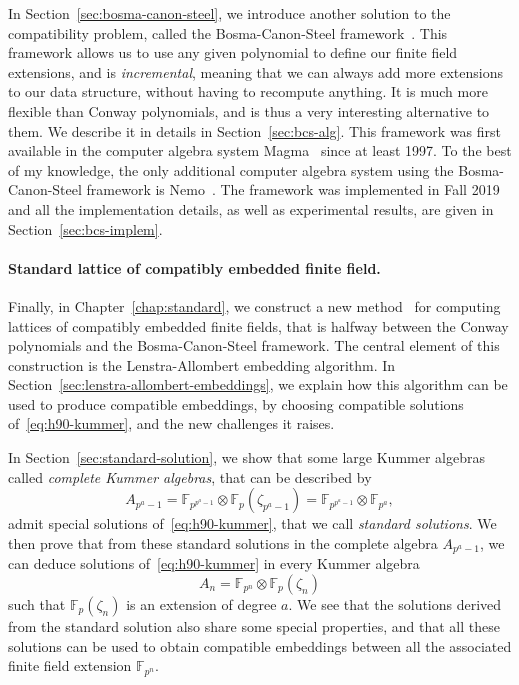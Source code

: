 In Section~\ref{sec:bosma-canon-steel}, we introduce another solution to the
compatibility problem, called the Bosma-Canon-Steel framework~\cite{BCS97}.
This framework allows us to use any given polynomial to define our finite field
extensions, and is \emph{incremental}, meaning that we can always add more
extensions to our data structure, without having to recompute anything. It is
much more flexible than Conway polynomials, and is thus a very interesting
alternative to them. We describe it in details in Section~\ref{sec:bcs-alg}.
This framework was first available in the computer algebra system
Magma~\cite{Magma} since at least 1997. To the best of my knowledge, the only
additional computer algebra system using the Bosma-Canon-Steel framework is
Nemo~\cite{Nemo}. The framework was implemented in Fall 2019 and all the
implementation details, as well as experimental results, are given in
Section~\ref{sec:bcs-implem}.

\paragraph{Standard lattice of compatibly embedded finite field.}
Finally, in Chapter~\ref{chap:standard}, we construct a new method~\cite{DRR19}
for computing lattices of compatibly embedded finite fields, that is halfway
between the Conway polynomials and the Bosma-Canon-Steel framework. The central
element of this construction is the Lenstra-Allombert embedding algorithm. In
Section~\ref{sec:lenstra-allombert-embeddings}, we explain how this algorithm
can be used to produce compatible embeddings, by choosing compatible solutions
of~\eqref{eq:h90-kummer}, and the new challenges it raises.

In Section~\ref{sec:standard-solution}, we show that some large Kummer algebras
called \emph{complete Kummer algebras}, that can be described by
\[
  A_{p^a-1} = \mathbb{F}_{p^{p^a-1}}\otimes\mathbb{F}_{p}(\zeta_{p^a-1})
  = \mathbb{F}_{p^{p^a-1}}\otimes \mathbb{F}_{p^a},
\]
admit special solutions of~\eqref{eq:h90-kummer}, that we call \emph{standard
solutions}. We then prove that from these standard solutions in the complete
algebra $A_{p^a-1}$, we can deduce solutions of~\eqref{eq:h90-kummer} in every
Kummer algebra
\[
  A_n = \mathbb{F}_{p^n}\otimes \mathbb{F}_{p}(\zeta_n)
\]
such that $\mathbb{F}_{p}(\zeta_n)$ is an extension of degree $a$. We see that
the solutions derived from the standard solution also share some special
properties, and that all these solutions can be used to obtain
compatible embeddings between all the associated finite field extension
$\mathbb{F}_{p^n}$.

